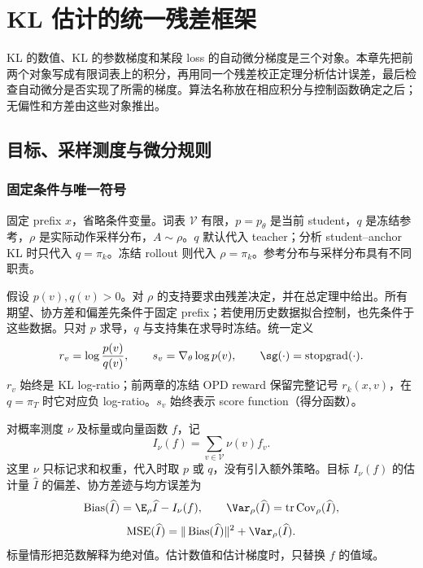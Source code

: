 \chapter{KL 估计的统一残差框架}
\label{chap:kl-estimation}

KL 的数值、KL 的参数梯度和某段 loss 的自动微分梯度是三个对象。本章先把前两个对象写成有限词表上的积分，再用同一个残差校正定理分析估计误差，最后检查自动微分是否实现了所需的梯度。算法名称放在相应积分与控制函数确定之后；无偏性和方差由这些对象推出。

\section{目标、采样测度与微分规则}
\label{sec:kl-targets}
\subsection{固定条件与唯一符号}

固定 prefix $x$，省略条件变量。词表 $\mathcal V$ 有限，$p=p_\theta$ 是当前 student，$q$ 是冻结参考，$\rho$ 是实际动作采样分布，$A\sim\rho$。$q$ 默认代入 teacher；分析 student--anchor KL 时只代入 $q=\pi_k$。冻结 rollout 则代入 $\rho=\pi_k$。参考分布与采样分布具有不同职责。

假设 $p(v),q(v)>0$。对 $\rho$ 的支持要求由残差决定，并在总定理中给出。所有期望、协方差和偏差先条件于固定 prefix；若使用历史数据拟合控制，也先条件于这些数据。只对 $p$ 求导，$q$ 与支持集在求导时冻结。统一定义
\[
 r_v=\log\frac{p(v)}{q(v)},\qquad
 s_v=\nabla_\theta\log p(v),\qquad
 \sg(\cdot)=\operatorname{stopgrad}(\cdot).
\]
$r_v$ 始终是 KL log-ratio；前两章的冻结 OPD reward 保留完整记号 $r_k(x,v)$，在 $q=\pi_T$ 时它对应负 log-ratio。$s_v$ 始终表示 score function（得分函数）。

\begin{definition}[积分与误差]
对概率测度 $\nu$ 及标量或向量函数 $f$，记
\[
 I_\nu(f)=\sum_{v\in\mathcal V}\nu(v)f_v.
\]
这里 $\nu$ 只标记求和权重，代入时取 $p$ 或 $q$，没有引入额外策略。目标 $I_\nu(f)$ 的估计量 $\widehat I$ 的偏差、协方差迹与均方误差为
\[
 \operatorname{Bias}(\widehat I)=\E_\rho\widehat I-I_\nu(f),\qquad
 \Var_\rho(\widehat I)=\operatorname{tr}\operatorname{Cov}_\rho(\widehat I),
\]
\[
 \operatorname{MSE}(\widehat I)
 =\|\operatorname{Bias}(\widehat I)\|^2+\Var_\rho(\widehat I).
\]
标量情形把范数解释为绝对值。估计数值和估计梯度时，只替换 $f$ 的值域。
\end{definition}

